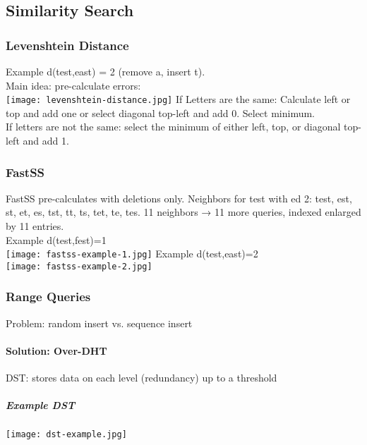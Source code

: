 \subsection{Similarity Search}
\subsubsection{Levenshtein Distance}
Example d(test,east) = 2 (remove a, insert t).\\
Main idea: pre-calculate errors:\\
\texttt{[image: levenshtein-distance.jpg]}
If Letters are the same: Calculate left or top and add one or select diagonal top-left and add 0. Select minimum. \\
If letters are not the same: select the minimum of either left, top, or diagonal top-left and add 1.

\subsubsection{FastSS}
FastSS pre-calculates with deletions only.
Neighbors for test with ed 2: test, est, st, et, es, tst, tt, ts, tet, te, tes.
11 neighbors → 11 more queries, indexed enlarged by 11 entries.\\
Example d(test,fest)=1\\
\texttt{[image: fastss-example-1.jpg]}
Example d(test,east)=2\\
\texttt{[image: fastss-example-2.jpg]}

\subsubsection{Range Queries}
Problem: random insert vs. sequence insert

\paragraph{Solution: Over-DHT}
DST: stores data on each level (redundancy) up to a threshold

\subparagraph{Example DST}
\texttt{[image: dst-example.jpg]}